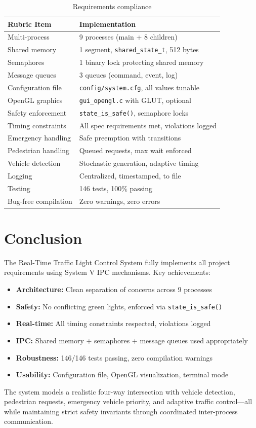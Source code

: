 \documentclass[11pt,a4paper]{article}
\begin{document}
\begin{table}[H]
\centering
\begin{tabular}{|l|l|}
\hline
\textbf{Rubric Item} & \textbf{Implementation} \\ \hline
Multi-process & 9 processes (main + 8 children) \\ \hline
Shared memory & 1 segment, \texttt{shared\_state\_t}, 512 bytes \\ \hline
Semaphores & 1 binary lock protecting shared memory \\ \hline
Message queues & 3 queues (command, event, log) \\ \hline
Configuration file & \texttt{config/system.cfg}, all values tunable \\ \hline
OpenGL graphics & \texttt{gui\_opengl.c} with GLUT, optional \\ \hline
Safety enforcement & \texttt{state\_is\_safe()}, semaphore locks \\ \hline
Timing constraints & All spec requirements met, violations logged \\ \hline
Emergency handling & Safe preemption with transitions \\ \hline
Pedestrian handling & Queued requests, max wait enforced \\ \hline
Vehicle detection & Stochastic generation, adaptive timing \\ \hline
Logging & Centralized, timestamped, to file \\ \hline
Testing & 146 tests, 100\% passing \\ \hline
Bug-free compilation & Zero warnings, zero errors \\ \hline
\end{tabular}
\caption{Requirements compliance}
\end{table}

\newpage
\section{Conclusion}

The Real-Time Traffic Light Control System fully implements all project requirements using System V IPC mechanisms. Key achievements:

\begin{itemize}
    \item \textbf{Architecture:} Clean separation of concerns across 9 processes
    \item \textbf{Safety:} No conflicting green lights, enforced via \texttt{state\_is\_safe()}
    \item \textbf{Real-time:} All timing constraints respected, violations logged
    \item \textbf{IPC:} Shared memory + semaphores + message queues used appropriately
    \item \textbf{Robustness:} 146/146 tests passing, zero compilation warnings
    \item \textbf{Usability:} Configuration file, OpenGL visualization, terminal mode
\end{itemize}

The system models a realistic four-way intersection with vehicle detection, pedestrian requests, emergency vehicle priority, and adaptive traffic control—all while maintaining strict safety invariants through coordinated inter-process communication.
\end{document}

